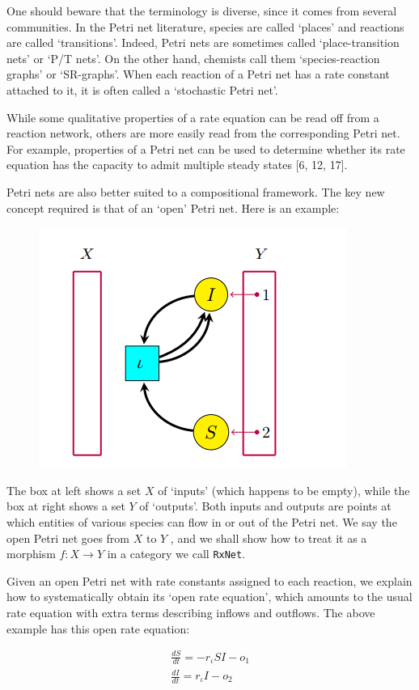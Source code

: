 \documentclass[]{compositionalityarticle}
\begin{document}
One should beware that the terminology is diverse, since it comes from several
communities. In the Petri net literature, species are called ‘places’ and reactions
are called ‘transitions’. Indeed, Petri nets are sometimes called ‘place-transition
nets’ or ‘P/T nets’. On the other hand, chemists call them ‘species-reaction
graphs’ or ‘SR-graphs’. When each reaction of a Petri net has a rate constant
attached to it, it is often called a ‘stochastic Petri net’.

While some qualitative properties of a rate equation can be read off from a
reaction network, others are more easily read from the corresponding Petri net.
For example, properties of a Petri net can be used to determine whether its rate
equation has the capacity to admit multiple steady states [6, 12, 17].

Petri nets are also better suited to a compositional framework. The key new concept required is that of an ‘open’ Petri net. Here is an example:

\begin{figure}
  \includegraphics[width=0.5 \textwidth]{fig2.png}
\end{figure}


The box at left shows a set $X$ of ‘inputs’ (which happens to be empty), while
the box at right shows a set $Y$ of ‘outputs’. Both inputs and outputs are points
at which entities of various species can flow in or out of the Petri net. We say
the open Petri net goes from $X$ to $Y$ , and we shall show how to treat it as a
morphism $f : X \rightarrow Y$ in a category we call \texttt{RxNet}.

Given an open Petri net with rate constants assigned to each reaction, we
explain how to systematically obtain its ‘open rate equation’, which amounts to
the usual rate equation with extra terms describing inflows and outflows. The
above example has this open rate equation:


\begin{multline}
  \frac{dS}{dt} = -r_{\iota} SI - o_1 \\
  \frac{dI}{dt} = r_{\iota} I - o_2
\end{multline}
\end{document}
